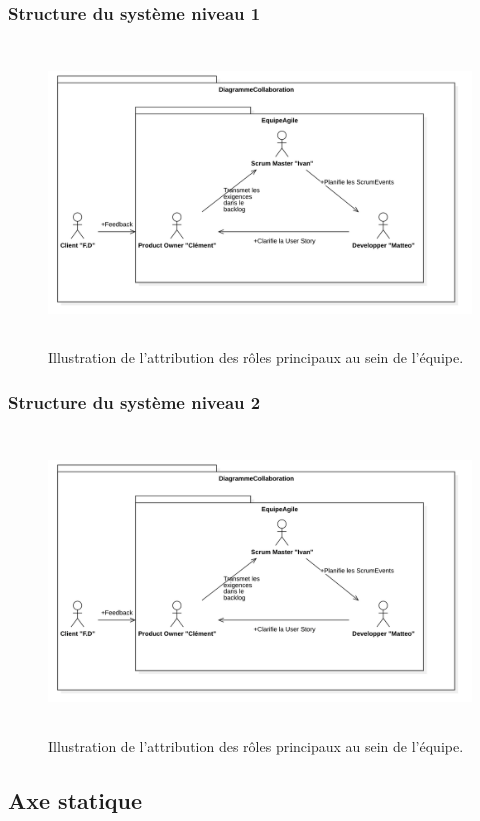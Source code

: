 \subsubsection{Structure du système niveau 1}
\begin{figure}[H]
	\centering
	\includegraphics[height=8cm]{img/diagCollaboration.png} 
	\caption{Illustration de l'attribution des rôles principaux au sein de l'équipe.}
\end{figure}

\subsubsection{Structure du système niveau 2}
\begin{figure}[H]
	\centering
	\includegraphics[height=8cm]{img/diagCollaboration.png} 
	\caption{Illustration de l'attribution des rôles principaux au sein de l'équipe.}
\end{figure}


\subsection{Axe statique}
